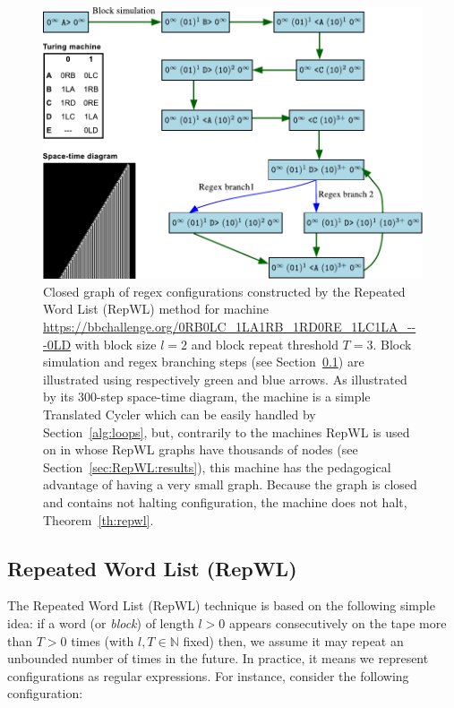 
\newpage

\begin{figure}[h!]
    \centering
    \includegraphics[scale=0.73]{figures/RepWL/RepWL_graph.pdf}
    \caption{{\small Closed graph of regex configurations constructed by the Repeated Word List (RepWL) method for machine \url{https://bbchallenge.org/0RB0LC_1LA1RB_1RD0RE_1LC1LA_---0LD} with block size $l=2$ and block repeat threshold $T=3$. Block simulation and regex branching steps (see Section~\ref{sec:RepWL}) are illustrated using respectively green and blue arrows. As illustrated by its 300-step space-time diagram, the machine is a simple Translated Cycler which can be easily handled by Section~\ref{alg:loops}, but, contrarily to the machines RepWL is used on in \CoqBB whose RepWL graphs have thousands of nodes (see Section~\ref{sec:RepWL:results}), this machine has the pedagogical advantage of having a very small graph. Because the graph is closed and contains not halting configuration, the machine does not halt, Theorem~\ref{th:repwl}.}}\label{fig:repWL}
\end{figure}

\subsection{Repeated Word List (RepWL)}\label{sec:RepWL}

The Repeated Word List (RepWL) technique is based on the following simple idea: if a word (or \textit{block}) of length $l > 0$ appears consecutively on the tape more than $T > 0$ times (with $l, T \in \mathbb{N}$ fixed) then, we assume it may repeat an unbounded number of times in the future. In practice, it means we represent configurations as regular expressions. For instance, consider the following configuration:

